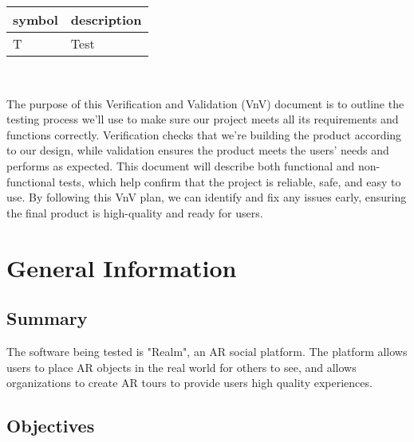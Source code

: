 \documentclass[12pt, titlepage]{article}
\begin{document}
\renewcommand{\arraystretch}{1.2}
\begin{tabular}{l l} 
  \toprule		
  \textbf{symbol} & \textbf{description}\\
  \midrule 
  T & Test\\
  \bottomrule
\end{tabular}\\



\newpage


The purpose of this Verification and Validation (VnV) document is to outline the testing process we’ll use to make sure our project meets all its requirements and functions correctly. Verification checks that we’re building the product according to our design, while validation ensures the product meets the users’ needs and performs as expected. This document will describe both functional and non-functional tests, which help confirm that the project is reliable, safe, and easy to use. By following this VnV plan, we can identify and fix any issues early, ensuring the final product is high-quality and ready for users.

\section{General Information}

\subsection{Summary}


The software being tested is "Realm", an AR social platform. The platform allows users to place AR objects in the real world for others to see, and allows organizations to create AR tours to provide users high quality experiences.

\subsection{Objectives}

\end{document}
